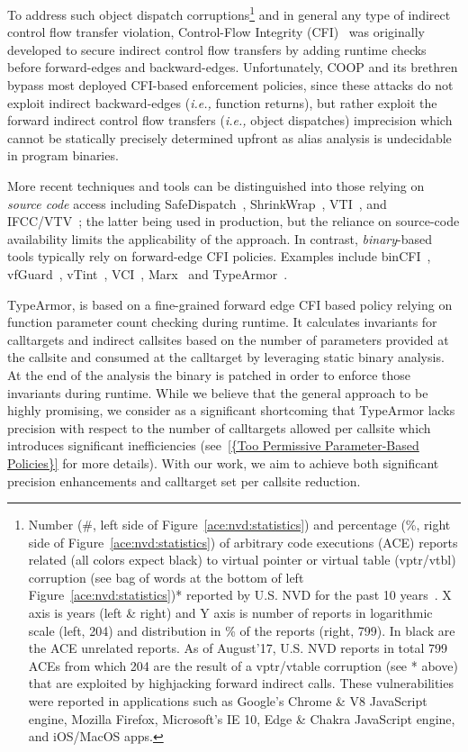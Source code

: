 To address such object dispatch corruptions\footnote{Number (\#, left side of Figure~\ref{ace:nvd:statistics}) and percentage (\%, right side of Figure~\ref{ace:nvd:statistics}) 
of arbitrary code executions (ACE) reports related (all colors expect black) to virtual pointer or virtual table (vptr/vtbl) corruption 
(see bag of words at the bottom of left Figure~\ref{ace:nvd:statistics})* reported by U.S. NVD for the past 10 years~\cite{NVD:ACE}. 
X axis is years (left \& right) and Y axis is number of reports in logarithmic scale (left, 204) and distribution in \% of the reports (right, 799).
In black are the ACE unrelated reports.
As of August'17, U.S. NVD reports in total 799 ACEs from which 204 are the result of a vptr/vtable corruption (see * above) that are exploited by highjacking forward indirect calls.
These vulnerabilities were reported in applications such as Google's Chrome \& V8 JavaScript engine, Mozilla Firefox, Microsoft's IE 10, Edge \& Chakra JavaScript engine, and iOS/MacOS apps.} 
and in general any type of indirect control flow transfer violation, Control-Flow Integrity (CFI)~\cite{abadi:cfi2, abadi:cfi} was originally developed to secure indirect control flow transfers by adding 
runtime checks before forward-edges and backward-edges. Unfortunately, COOP and its brethren bypass most deployed CFI-based enforcement policies, since 
these attacks do not exploit indirect backward-edges (\textit{i.e.,} function returns), but rather exploit the forward indirect control flow transfers (\textit{i.e.,} object dispatches)
imprecision which cannot be statically precisely determined upfront as alias analysis is undecidable~\cite{alias:undecidable} in program binaries.

More recent techniques and tools can be distinguished into those relying on \textit{source code} access including SafeDispatch~\cite{safedispatch:jang}, ShrinkWrap~\cite{haller:shrinkwrap}, 
VTI~\cite{bounov:interleaving}, and IFCC/VTV~\cite{vtv:tice}; the latter being used in production, but the reliance on source-code availability limits the applicability of the approach. 
In contrast, \textit{binary}-based tools typically rely on forward-edge CFI policies. Examples include binCFI~\cite{ccfir:zhang, zhang:usenix}, vfGuard~\cite{vfuard:aravind}, vTint~\cite{vtint:zhang}, 
VCI~\cite{vci:asiaccs}, Marx~\cite{marx} and TypeArmor~\cite{veen:typearmor}. 

TypeArmor, is based on a fine-grained forward edge CFI based policy relying on function parameter count checking during runtime. It calculates invariants for calltargets and indirect 
callsites based on the number of parameters provided at the callsite and consumed at the calltarget  
by leveraging static binary analysis. At the end of the analysis the binary is patched in order to enforce those invariants during runtime. 
While we believe that the general approach to be highly promising, we consider 
as a significant shortcoming that TypeArmor lacks precision with respect to the number of calltargets allowed per callsite which introduces significant 
inefficiencies (see~\cref{{Too Permissive Parameter-Based Policies}} for more details). 
With our work, we aim to achieve both significant precision enhancements and calltarget set per callsite reduction.

